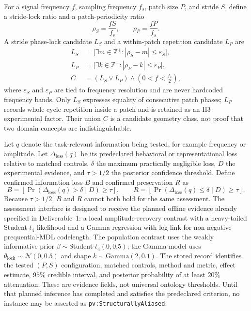 \documentclass[
	letterpaper,
	10pt,
	unnumberedsections,
	twoside,
]{LTJournalArticle}
\newcommand{\valueof}[1]{\texttt{pv:#1}}
\begin{document}
For a signal frequency $f$, sampling frequency $f_s$, patch size $P$, and stride $S$, define a stride-lock ratio and a patch-periodicity ratio
\begin{equation}
\rho_S=\frac{fS}{f_s},
\qquad
\rho_P=\frac{fP}{f_s}.
\label{eq:locking-ratio}
\end{equation}
A stride phase-lock candidate $L_S$ and a within-patch repetition candidate $L_P$ are
\begin{equation}
\begin{aligned}
L_S&=\big[\exists m\in\mathbb{Z}^{+}:|\rho_S-m|\leq\varepsilon_S\big],\\
L_P&=\big[\exists k\in\mathbb{Z}^{+}:|\rho_P-k|\leq\varepsilon_P\big],\\
C&=(L_S\vee L_P)\wedge\left(0<f<\frac{f_s}{2}\right),
\end{aligned}
\label{eq:locking-candidate}
\end{equation}
where $\varepsilon_S$ and $\varepsilon_P$ are tied to frequency resolution and are never hardcoded frequency bands. Only $L_S$ expresses equality of consecutive patch phases; $L_P$ records whole-cycle repetition inside a patch and is retained as an H3 experimental factor. Their union $C$ is a candidate geometry class, not proof that two domain concepts are indistinguishable.

Let $q$ denote the task-relevant information being tested, for example frequency or amplitude. Let $\Delta_{\mathrm{loss}}(q)$ be its predeclared behavioral or representational loss relative to matched controls, $\delta$ the maximum practically negligible loss, $D$ the experimental evidence, and $\tau>1/2$ the posterior confidence threshold. Define confirmed information loss $B$ and confirmed preservation $R$ as
\begin{equation}
B=\left[\Pr\!\left(\Delta_{\mathrm{loss}}(q)>\delta\mid D\right)\geq\tau\right],
\qquad
R=\left[\Pr\!\left(\Delta_{\mathrm{loss}}(q)\leq\delta\mid D\right)\geq\tau\right].
\label{eq:bayesian-evidence}
\end{equation}
Because $\tau>1/2$, $B$ and $R$ cannot both hold for the same assessment. The assessment interface is designed to receive the planned offline evidence already specified in Deliverable~1: a local amplitude-recovery contrast with a heavy-tailed Student-$t_4$ likelihood and a Gamma regression with log link for non-negative prequential-MDL codelength. The population contrast uses the weakly informative prior $\bar\beta\sim\text{Student-}t_4(0,0.5)$; the Gamma model uses $\theta_{\mathrm{lock}}\sim\mathcal N(0,0.5)$ and shape $k\sim\mathrm{Gamma}(2,0.1)$. The stored record identifies the tested $(P,S)$ configuration, matched controls, method and metric, effect estimate, $95\%$ credible interval, and posterior probability of at least $20\%$ attenuation. These are evidence fields, not universal ontology thresholds. Until that planned inference has completed and satisfies the predeclared criterion, no instance may be asserted as \valueof{StructurallyAliased}.
\end{document}

